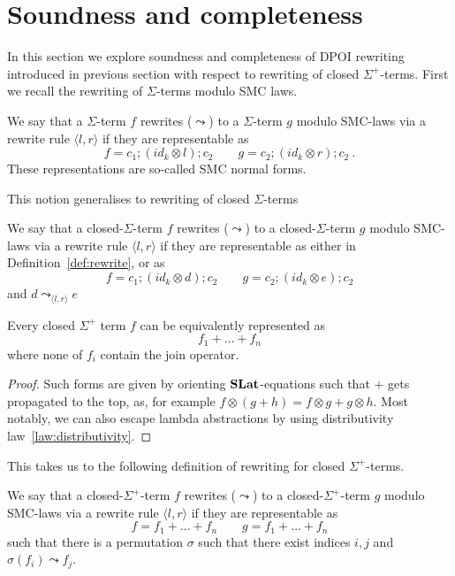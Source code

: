 \section{Soundness and completeness}

In this section we explore soundness and completeness of DPOI rewriting introduced in previous section with respect to rewriting of closed $\Sigma^{+}$-terms.
First we recall the rewriting of $\Sigma$-terms modulo SMC laws.

\begin{definition}
\label{def:rewrite}
    We say that a $\Sigma$-term $f$ rewrites ($\leadsto$) to a $\Sigma$-term $g$ modulo SMC-laws via a rewrite rule $\langle l, r \rangle$ if they are representable as
    \[
    f = c_{1};(id_{k} \otimes l);c_{2} \qquad g = c_{2};(id_{k} \otimes r);c_{2}~.
    \]
    These representations are so-called SMC normal forms.
\end{definition}

This notion generalises to rewriting of closed $\Sigma$-terms

\begin{definition}
    We say that a closed-$\Sigma$-term $f$ rewrites ($\leadsto$) to a closed-$\Sigma$-term $g$ modulo SMC-laws via a rewrite rule $\langle l, r \rangle$ if they are representable as either in Definition~\ref{def:rewrite}, or as 
    \[
    f = c_{1};(id_{k} \otimes d);c_{2} \qquad g = c_{2};(id_{k} \otimes e);c_{2}
    \]
    and $d \leadsto_{\langle l, r \rangle} e$
\end{definition}

\begin{lemma}

    Every closed $\Sigma^{+}$ term $f$ can be equivalently represented as
    \[
    f_{1} + \ldots + f_{n}
    \] where none of $f_{i}$ contain the join operator.
\end{lemma}
\begin{proof}
Such forms are given by orienting $\mathbf{SLat}$-equations such that $+$ gets propagated to the top, as, for example $f \otimes (g + h) = f \otimes g + g \otimes h$.
Most notably, we can also escape lambda abstractions by using distributivity law~\ref{law:distributivity}.
\end{proof}

This takes us to the following definition of rewriting for closed $\Sigma^{+}$-terms.
\begin{definition}
    We say that a closed-$\Sigma^{+}$-term $f$ rewrites ($\leadsto$) to a closed-$\Sigma^{+}$-term $g$ modulo SMC-laws via a rewrite rule $\langle l, r \rangle$ if they are representable as
    \[
    f = f_{1} + \ldots + f_{n} \qquad g = f_{1} + \ldots + f_{n}
    \]
    such that there is a permutation $\sigma$ such that there exist indices $i,j$ and $\sigma(f_{i}) \leadsto f_{j}$.
\end{definition}

